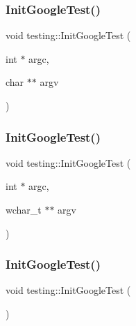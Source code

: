 \mbox{\label{namespacetesting_afd726ae08c9bd16dc52f78c822d9946b}} 
\subsubsection{\texorpdfstring{InitGoogleTest()}{InitGoogleTest()}\hspace{0.1cm}{\footnotesize\ttfamily [1/3]}}
{\footnotesize\ttfamily void testing\+::\+Init\+Google\+Test (\begin{DoxyParamCaption}\item[{int $\ast$}]{argc,  }\item[{char $\ast$$\ast$}]{argv }\end{DoxyParamCaption})}

\mbox{\label{namespacetesting_ae5a88709a4a7529e30c83242156556b3}} 
\subsubsection{\texorpdfstring{InitGoogleTest()}{InitGoogleTest()}\hspace{0.1cm}{\footnotesize\ttfamily [2/3]}}
{\footnotesize\ttfamily void testing\+::\+Init\+Google\+Test (\begin{DoxyParamCaption}\item[{int $\ast$}]{argc,  }\item[{wchar\+\_\+t $\ast$$\ast$}]{argv }\end{DoxyParamCaption})}

\mbox{\label{namespacetesting_ace27eb9a2534996f3711aa719689f987}} 
\subsubsection{\texorpdfstring{InitGoogleTest()}{InitGoogleTest()}\hspace{0.1cm}{\footnotesize\ttfamily [3/3]}}
{\footnotesize\ttfamily void testing\+::\+Init\+Google\+Test (\begin{DoxyParamCaption}{ }\end{DoxyParamCaption})}

